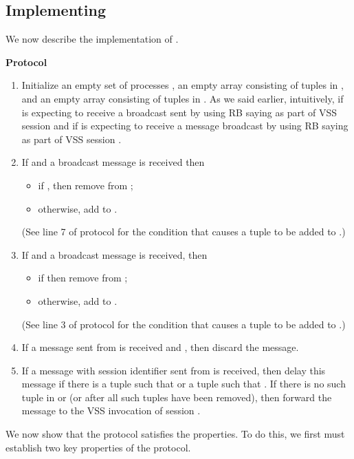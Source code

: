 \documentclass{sig-alternate}
\def\beginsmall#1{\vspace{-\parskip}\begin{#1}\itemsep-\parskip}
\def\endsmall#1{\end{#1}\vspace{-\parskip}}
\newcommand{\mwdavss}{\text{MW-SVSS}\xspace}
\newcommand{\DMM}{\text{DMM}\xspace}
\begin{document}
\subsection{Implementing \DMM}
We now describe the implementation of .


\medskip
\textbf{Protocol }
\vspace{-2mm}
\beginsmall{enumerate}

\item Initialize an empty set of processes , an empty array 
consisting of tuples in , and an empty array  consisting of tuples in .
As we said earlier,
intuitively,  if  is expecting to receive a
    broadcast sent by  using RB saying  as part of VSS
session 
and
     if  is expecting to receive a
    message broadcast by  using RB saying 
    as part of VSS session .


\item If  and a broadcast message  is
received then
    \beginsmall{itemize}
    \item if , then remove  from ;

\item otherwise, add  to .

    \endsmall{itemize}

    (See line 7 of protocol  for the condition that causes
    a tuple  to be added to .)

\item   If  and a broadcast message 
is received, then
    \beginsmall{itemize}
    \item if  then remove  from ;

    \item otherwise, add  to .
    \endsmall{itemize}

    (See line 3 of protocol  for the condition that causes
    a tuple  to be added to .)

\item If a message sent from  is received and , then
discard the message.

\item If a message with session identifier  sent from  is received, then delay this message if there is a tuple
 such that  or a
tuple   such that .
If there is no such tuple in  or  (or after all such tuples
have been removed), then forward the message to the
   VSS invocation of session .

\endsmall{enumerate}



We now show that the \mwdavss protocol satisfies the \mwdavss
properties.  To do this, we first must establish two key properties of
the \DMM protocol.
\end{document}
